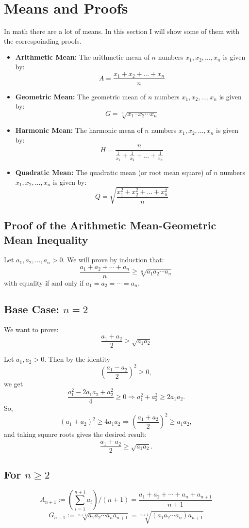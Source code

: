 \section{Means and Proofs}
In math there are a lot of means. In this section I will show some of them with the correspoinding proofs.

\begin{itemize}
    \item \textbf{Arithmetic Mean:} The arithmetic mean of \( n \) numbers \( x_1, x_2, \ldots, x_n \) is given by:
    \[
    A = \frac{x_1 + x_2 + \ldots + x_n}{n}
    \]
    \item \textbf{Geometric Mean:} The geometric mean of \( n \) numbers \( x_1, x_2, \ldots, x_n \) is given by:
    \[
    G = \sqrt[n]{x_1 \cdot x_2 \cdots x_n}
    \]
    \item \textbf{Harmonic Mean:} The harmonic mean of \( n \) numbers \( x_1, x_2, \ldots, x_n \) is given by:
    \[
    H = \frac{n}{\frac{1}{x_1} + \frac{1}{x_2} + \ldots + \frac{1}{x_n}}
    \]
    \item \textbf{Quadratic Mean:} The quadratic mean (or root mean square) of \( n \) numbers \( x_1, x_2, \ldots, x_n \) is given by:
    \[
    Q = \sqrt{\frac{x_1^2 + x_2^2 + \ldots + x_n^2}{n}}
    \]
\end{itemize}

\subsection{Proof of the Arithmetic Mean-Geometric Mean Inequality}

Let \( a_1, a_2, \dots, a_n > 0 \). We will prove by induction that:
\[
\frac{a_1 + a_2 + \cdots + a_n}{n} \geq \sqrt[n]{a_1 a_2 \cdots a_n}
\]
with equality if and only if \( a_1 = a_2 = \cdots = a_n \).

\subsection*{Base Case: \( n = 2 \)}

We want to prove:
\[
\frac{a_1 + a_2}{2} \geq \sqrt{a_1 a_2}
\]

Let \( a_1, a_2 > 0 \). Then by the identity
\[
\left( \frac{a_1 - a_2}{2} \right)^2 \geq 0,
\]
we get
\[
\frac{a_1^2 - 2a_1a_2 + a_2^2}{4} \geq 0 \Rightarrow a_1^2 + a_2^2 \geq 2a_1a_2.
\]
So,
\[
(a_1 + a_2)^2 \geq 4a_1a_2 \Rightarrow \left( \frac{a_1 + a_2}{2} \right)^2 \geq a_1a_2,
\]
and taking square roots gives the desired result:
\[
\frac{a_1 + a_2}{2} \geq \sqrt{a_1 a_2}.
\]

\subsection*{For \( n \geq 2 \)}

\[
A_{n + 1} := (\sum_{i=1}^{n + 1} a_i) / (n + 1) = \frac{a_1 + a_2 + \cdots + a_n + a_{n + 1}}{n + 1}
\]
\[
G_{n + 1} := \sqrt[n + 1]{a_1 a_2 \cdots a_n a_{n + 1}} = \sqrt[n + 1]{(a_1 a_2 \cdots a_n) a_{n + 1}}
\]
